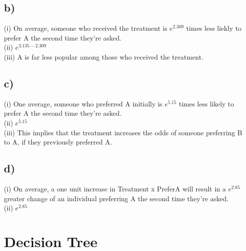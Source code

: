 \documentclass[12pt, letterpaper]{article}
\begin{document}
\subsection*{b)} (i) On average, someone who received the treatment is $e^{2.309}$ times less liekly to prefer A the second time they're asked.\\
(ii) $e^{3.135-2.309}$\\
(iii) A is far less popular among those who received the treatment.

\subsection*{c)} (i) One average, someone who preferred A initially is $e^{5.15}$ times less likely to prefer A the second time they're asked.\\
(ii) $e^{5.15}$\\
(iii) This implies that the treatment increases the odds of someone preferring B to A, if they previously preferred A.

\subsection*{d)} (i) On average, a one unit increase in Treatment x PreferA will result in a $e^{2.85}$ greater change of an individual preferring A the second time they're asked.\\
(ii) $e^{2.85}$


\newpage
\section{Decision Tree }
\end{document}
